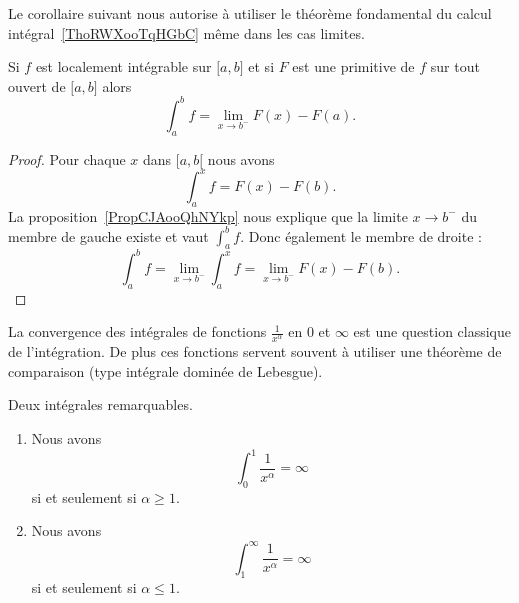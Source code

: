 Le corollaire suivant nous autorise à utiliser le théorème fondamental du calcul intégral~\ref{ThoRWXooTqHGbC} même dans les cas limites.
\begin{corollary}   \label{CorMUIooXREleR}
    Si \( f\) est localement intégrable sur \( \mathopen[ a , b \mathclose]\) et si \( F\) est une primitive de \( f\) sur tout ouvert de \( \mathopen[ a , b \mathclose]\) alors
    \begin{equation}
        \int_a^bf=\lim_{x\to b^-} F(x)-F(a).
    \end{equation}
\end{corollary}

\begin{proof}
    Pour chaque \( x\) dans \( \mathopen[ a , b [\) nous avons
    \begin{equation}
        \int_a^xf=F(x)-F(b).
    \end{equation}
    La proposition~\ref{PropCJAooQhNYkp} nous explique que la limite \( x\to b^-\) du membre de gauche existe et vaut \( \int_a^bf\). Donc également le membre de droite :
    \begin{equation}
        \int_a^bf=\lim_{x\to b^-} \int_a^xf=\lim_{x\to b^-} F(x)-F(b).
    \end{equation}
\end{proof}

La convergence des intégrales de fonctions \( \frac{1}{ x^{\alpha} }\) en \( 0\) et \( \infty\) est une question classique de l'intégration. De plus ces fonctions servent souvent à utiliser une théorème de comparaison (type intégrale dominée de Lebesgue).
\begin{proposition} \label{PropBKNooPDIPUc}
    Deux intégrales remarquables.
    \begin{enumerate}
        \item

            Nous avons
    \begin{equation}
        \int_0^1\frac{1}{ x^\alpha }=\infty
    \end{equation}
    si et seulement si \( \alpha\geq 1\).

\item   \label{ITEMooJFSXooHmgmEj}

    Nous avons
    \begin{equation}
        \int_1^{\infty}\frac{1}{ x^{\alpha} }=\infty
    \end{equation}
    si et seulement si \( \alpha\leq1\).

    \end{enumerate}

\end{proposition}

